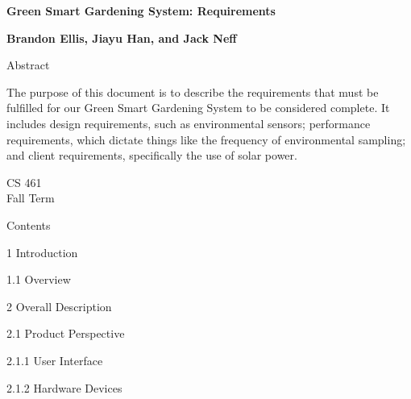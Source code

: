 \documentclass[IEEEtran,letterpaper,10pt,titlepage,fleqn,draftclsnofoot,onecolumn]{article}
\begin{document}
\begin{titlepage}
	\begin{center}
		\vspace*{1cm}
		
		\huge
		\textbf{Green Smart Gardening System: Requirements}
        
        \vspace{1.5cm}
        
		\large
        \textbf{Brandon Ellis, Jiayu Han, and Jack Neff}
		
		\vspace{5cm}
    
    \large
    Abstract
    
    \vspace{5mm}
    
    \normalsize
    The purpose of this document is to describe the requirements that must be fulfilled for our Green Smart Gardening System to be considered complete. It includes design requirements, such as environmental sensors; performance requirements, which dictate things like the frequency of environmental sampling; and client requirements, specifically the use of solar power.
		
		\vfill
        
		\large
        CS 461\\
        Fall Term\\
    \end{center}
\end{titlepage}

\huge
Contents

\vspace{5mm}

\large
1 Introduction

\vspace{1mm}

\normalsize
1.1 Overview

\vspace{5mm}

\large
2 Overall Description

\vspace{1mm}

\normalsize
2.1 Product Perspective

\vspace{1mm}

\small
2.1.1 User Interface

\vspace{1mm}

\small
2.1.2 Hardware Devices
\end{document}
